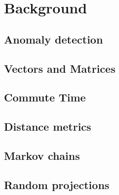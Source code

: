 \chapter{Background}
\label{ch:background}

\section{Anomaly detection}
\label{sec:anomalyDetection}


\section{Vectors and Matrices}
\label{sec:vectorsAndMatrices}


\section{Commute Time}
\label{sec:commuteTime}


\section{Distance metrics}
\label{sec:distanceMetrics}


\section{Markov chains}
\label{sec:markovChains}


\section{Random projections}
\label{sec:randomProjections}


